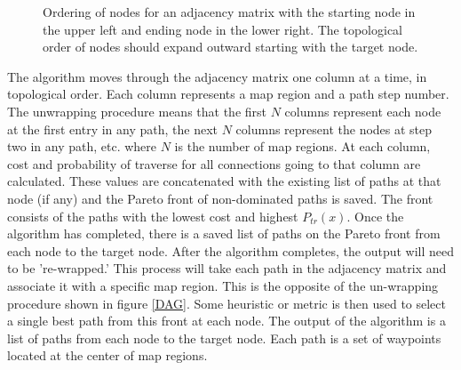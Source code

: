 \documentclass[journal]{IEEEtran}
\newcounter{row}
\newcounter{col}
\begin{document}
\begin{figure}[h]
\begin{center}

\newcommand\setrow[5]{
\setcounter{col}{1}
\foreach \n in {#1, #2, #3, #4, #5} {

	\edef\x{\value{col} - 0.5}
	\edef\y{5.5 - \value{row}}
	\node[anchor=center] at (\x, \y) {\n};
	\stepcounter{col}
	}
	\stepcounter{row}
}


\end{center}
\caption{Ordering of nodes for an adjacency matrix with the starting node in the upper left and ending node in the lower right. The topological order of nodes should expand outward starting with the target node. }
\end{figure}  
The algorithm moves through the adjacency matrix one column at a time, in topological order. 
Each column represents a map region and a path step number. 
The unwrapping procedure means that the first $N$ columns represent each node at the first entry in any path, the next $N$ columns represent the nodes at step two in any path, etc. where $N$ is the number of map regions.
At each column, cost and probability of traverse for all connections going to that column are calculated. 
These values are concatenated with the existing list of paths at that node (if any) and the Pareto front of non-dominated paths is saved. 
The front consists of the paths with the lowest cost and highest $P_{tr}(x)$. 
Once the algorithm has completed, there is a saved list of paths on the Pareto front from each node to the target node.
After the algorithm completes, the output will need to be 're-wrapped.' 
This process will take each path in the adjacency matrix and associate it with a specific map region.
This is the opposite of the un-wrapping procedure shown in figure \ref{DAG}. 
Some heuristic or metric is then used to select a single best path from this front at each node.
The output of the algorithm is a list of paths from each node to the target node. 
Each path is a set of waypoints located at the center of map regions. 
\end{document}
